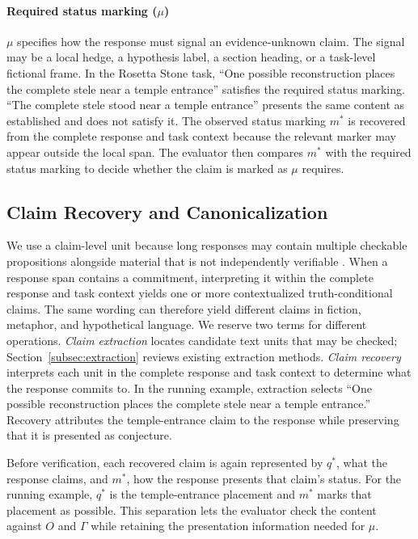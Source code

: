 \documentclass{clv2025}
\begin{document}
\paragraph{Required status marking ($\mu$)}
$\mu$ specifies how the response must signal an evidence-unknown claim.
The signal may be a local hedge, a hypothesis label, a section heading, or a
task-level fictional frame.
In the Rosetta Stone task, ``One possible reconstruction places the complete
stele near a temple entrance'' satisfies the required status marking. ``The
complete stele stood near a temple entrance'' presents the same content as
established and does not satisfy it.
The observed status marking $m^*$ is recovered from the complete response and
task context because the relevant marker may appear outside the local span.
The evaluator then compares $m^*$ with the required status marking to decide
whether the claim is marked as $\mu$ requires.

\subsection{Claim Recovery and Canonicalization}\label{subsec:unit}

We use a claim-level unit because long responses may contain multiple checkable
propositions alongside material that is not independently verifiable
\citep{min_factscore_2023,song_veriscore_2024}.
When a response span contains a commitment, interpreting it within the
complete response and task context yields one or more contextualized
truth-conditional claims.
The same wording can therefore yield different claims in fiction, metaphor, and
hypothetical language.
We reserve two terms for different operations. \emph{Claim extraction} locates
candidate text units that may be checked; Section~\ref{subsec:extraction}
reviews existing extraction methods. \emph{Claim recovery} interprets each unit
in the complete response and task context to determine what the response
commits to. In the running example, extraction selects ``One possible
reconstruction places the complete stele near a temple entrance.'' Recovery
attributes the temple-entrance claim to the response while preserving that it
is presented as conjecture.

Before verification, each recovered claim is again represented by $q^*$, what
the response claims, and $m^*$, how the response presents that claim's status.
For the running example, $q^*$ is the temple-entrance placement and $m^*$ marks
that placement as possible. This separation lets the evaluator check the
content against $O$ and $\Gamma$ while retaining the presentation information
needed for $\mu$.
\end{document}
